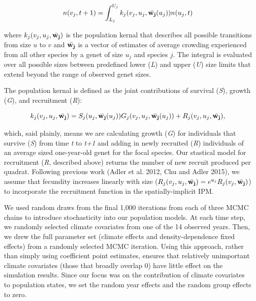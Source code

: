 \documentclass[12pt,]{article}
\begin{document}
\begin{equation}
n(v_{j},t+1) = \int_{L_{j}}^{U_{j}} k_{j}(v_{j},u_{j},\bar{\bold{w_{j}}}(u_{j}))n(u_{j},t)
\end{equation}

where $k_{j}(v_{j},u_{j},\bar{\bold{w_{j}}})$ is the population kernal
that describes all possible transitions from size $u$ to $v$ and
$\bar{\bold{w_{j}}}$ is a vector of estimates of average crowding
experienced from all other species by a genet of size $u_j$ and species
$j$. The integral is evaluated over all possible sizes between
predefined lower (\emph{L}) and upper (\emph{U}) size limits that extend
beyond the range of observed genet sizes.

The population kernal is defined as the joint contributions of survival
(\emph{S}), growth (\emph{G}), and recruitment (\emph{R}):

\begin{equation}
k_{j}(v_{j},u_{j},\bar{\bold{w_{j}}}) = S_j(u_j, \bar{\bold{w_{j}}}(u_{j}))G_j(v_{j},u_{j},\bar{\bold{w_{j}}}(u_{j})) + R_j(v_{j},u_{j},\bar{\bold{w_{j}}}),
\end{equation}

which, said plainly, means we are calculating growth (\emph{G}) for
individuals that survive (\emph{S}) from time \emph{t} to \emph{t+1} and
adding in newly recruited (\emph{R}) individuals of an average sized
one-year-old genet for the focal species. Our stastical model for
recruitment (\emph{R}, described above) returns the number of new
recruit produced per quadrat. Following previous work (Adler et al.
2012, Chu and Adler 2015), we assume that fecundity increases linearly
with size
($R_j(v_{j},u_{j},\bar{\bold{w_{j}}}) = e^{u_j}R_j(v_{j},\bar{\bold{w_{j}}})$)
to incorporate the recruitment function in the spatially-implicit IPM.

We used random draws from the final 1,000 iterations from each of three
MCMC chains to introduce stochasticity into our population models. At
each time step, we randomly selected climate covariates from one of the
14 observed years. Then, we drew the full parameter set (climate effects
and density-dependence fixed effects) from a randomly selected MCMC
iteration. Using this approach, rather than simply using coefficient
point estimates, ensures that relatively unimportant climate covariates
(those that broadly overlap 0) have little effect on the simulation
results. Since our focus was on the contribution of climate covariates
to population states, we set the random year effects and the random
group effects to zero.
\end{document}
